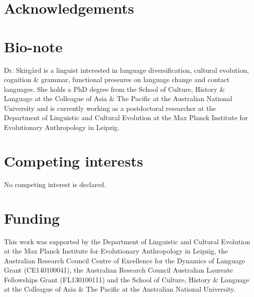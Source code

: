 \documentclass[unnumsec,webpdf,modern,medium]{oup-authoring-template}
\begin{document}
\singlespacing
\onecolumn

\section{Acknowledgements}


\section{Bio-note}
Dr. Skirgård is a linguist interested in language diversification, cultural evolution, cognition \& grammar, functional pressures on language change and contact languages. She holds a PhD degree from the School of Culture, History \& Language at the Colleague of Asia \& The Pacific at the Australian National University and is currently working as a postdoctoral researcher at the Department of Linguistic and Cultural Evolution at the Max Planck Institute for Evolutionary Anthropology in Leipzig.

\section{Competing interests}
No competing interest is declared.

\section{Funding}
This work was supported by the Department of Linguistic and Cultural Evolution at the Max Planck Institute for Evolutionary Anthropology in Leipzig, the Australian Research Council Centre of Excellence for the Dynamics of Language Grant (CE140100041), the Australian Research Council Australian Laureate Fellowships Grant (FL130100111) and the School of Culture, History \& Language at the Colleague of Asia \& The Pacific at the Australian National University.





\end{document}
